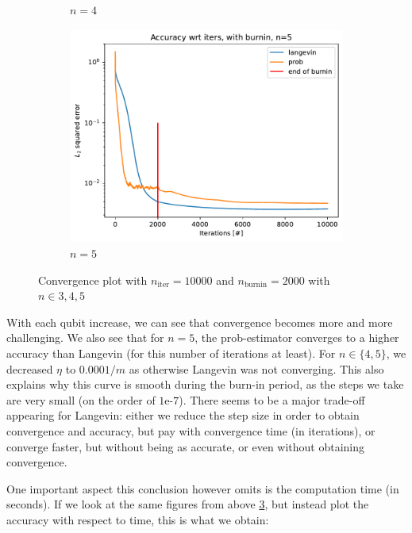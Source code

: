 \documentclass[12pt]{memoir}
\newcommand{\nitern}[1]{$n_{\text{iter}}=#1$}
\newcommand{\nburninn}[1]{$n_{\text{burnin}}=#1$}
\begin{document}
\begin{figure}[H]
\begin{subfigure}[b]{0.49\textwidth}
        \caption{$n=4$}
        \label{fig:conv-plot-diff-n-4-sub}
    \end{subfigure}
    \begin{subfigure}[b]{0.49\textwidth}
        \centering
        \includegraphics[width=\textwidth]{figures/experiments/baseline/diff_n_qubits/iters_acc_comp_iters_no_avg_n5-1.png}
        \caption{$n=5$}
        \label{fig:conv-plot-diff-n-5-sub}
    \end{subfigure}
    \caption{Convergence plot with \nitern{10000} and \nburninn{2000} with $n\in{3,4,5}$}
    \label{fig:conv-plot-diff-n}
\end{figure}

With each qubit increase, we can see that convergence becomes more and more challenging. We also see that for $n=5$, the prob-estimator converges to a higher accuracy than Langevin (for this number of iterations at least). For $n\in\{4,5\}$, we decreased $\eta$ to $0.0001/m$ as otherwise Langevin was not converging. This also explains why this curve is smooth during the burn-in period, as the steps we take are very small (on the order of $1\text{e-}7$). There seems to be a major trade-off appearing for Langevin: either we reduce the step size in order to obtain convergence and accuracy, but pay with convergence time (in iterations), or converge faster, but without being as accurate, or even without obtaining convergence. \medbreak

One important aspect this conclusion however omits is the computation time (in seconds). If we look at the same figures from above \ref{fig:conv-plot-diff-n}, but instead plot the accuracy with respect to time, this is what we obtain:
\end{document}
